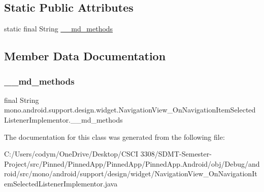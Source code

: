 \subsection*{Static Public Attributes}
\begin{DoxyCompactItemize}
\item 
static final String \hyperlink{classmono_1_1android_1_1support_1_1design_1_1widget_1_1_navigation_view___on_navigation_item_selected_listener_implementor_a30bf6324733fb7eb1ec7e952888ba859}{\+\_\+\+\_\+md\+\_\+methods}
\end{DoxyCompactItemize}


\subsection{Member Data Documentation}
\mbox{\label{classmono_1_1android_1_1support_1_1design_1_1widget_1_1_navigation_view___on_navigation_item_selected_listener_implementor_a30bf6324733fb7eb1ec7e952888ba859}} 
\subsubsection{\texorpdfstring{\+\_\+\+\_\+md\+\_\+methods}{\_\_md\_methods}}
{\footnotesize\ttfamily final String mono.\+android.\+support.\+design.\+widget.\+Navigation\+View\+\_\+\+On\+Navigation\+Item\+Selected\+Listener\+Implementor.\+\_\+\+\_\+md\+\_\+methods\hspace{0.3cm}{\ttfamily [static]}}



The documentation for this class was generated from the following file\+:\begin{DoxyCompactItemize}
\item 
C\+:/\+Users/codym/\+One\+Drive/\+Desktop/\+C\+S\+C\+I 3308/\+S\+D\+M\+T-\/\+Semester-\/\+Project/src/\+Pinned/\+Pinned\+App/\+Pinned\+App/\+Pinned\+App.\+Android/obj/\+Debug/android/src/mono/android/support/design/widget/Navigation\+View\+\_\+\+On\+Navigation\+Item\+Selected\+Listener\+Implementor.\+java\end{DoxyCompactItemize}
